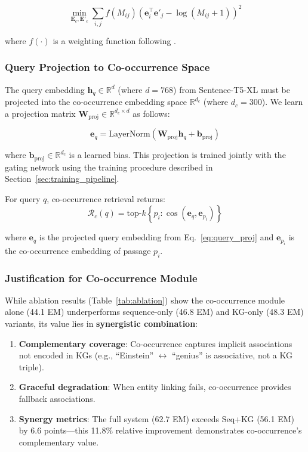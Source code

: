 \documentclass[10pt,twocolumn]{article}
\begin{document}
\begin{equation}
\min_{\mathbf{E}_c, \mathbf{E}'_c} \sum_{i,j} f(M_{ij}) \left( \mathbf{e}_i^\top \mathbf{e}'_j - \log(M_{ij} + 1) \right)^2
\end{equation}

where $f(\cdot)$ is a weighting function following \cite{pennington2014glove}.

\subsubsection{Query Projection to Co-occurrence Space}
\label{sec:query_projection}

The query embedding $\mathbf{h}_q \in \mathbb{R}^{d}$ (where $d=768$) from Sentence-T5-XL must be projected into the co-occurrence embedding space $\mathbb{R}^{d_c}$ (where $d_c=300$). We learn a projection matrix $\mathbf{W}_{\text{proj}} \in \mathbb{R}^{d_c \times d}$ as follows:

\begin{equation}
\mathbf{e}_q = \text{LayerNorm}(\mathbf{W}_{\text{proj}} \mathbf{h}_q + \mathbf{b}_{\text{proj}})
\label{eq:query_proj}
\end{equation}

where $\mathbf{b}_{\text{proj}} \in \mathbb{R}^{d_c}$ is a learned bias. This projection is trained jointly with the gating network using the training procedure described in Section~\ref{sec:training_pipeline}.

For query $q$, co-occurrence retrieval returns:
\begin{equation}
\mathcal{R}_c(q) = \text{top-}k \left\{ p_i : \cos(\mathbf{e}_q, \mathbf{e}_{p_i}) \right\}
\end{equation}

where $\mathbf{e}_q$ is the projected query embedding from Eq.~\ref{eq:query_proj} and $\mathbf{e}_{p_i}$ is the co-occurrence embedding of passage $p_i$.


\subsubsection{Justification for Co-occurrence Module}
\label{sec:cooc_justification}

While ablation results (Table~\ref{tab:ablation}) show the co-occurrence module alone (44.1 EM) underperforms sequence-only (46.8 EM) and KG-only (48.3 EM) variants, its value lies in \textbf{synergistic combination}:

\begin{enumerate}
    \item \textbf{Complementary coverage}: Co-occurrence captures implicit associations not encoded in KGs (e.g., ``Einstein'' $\leftrightarrow$ ``genius'' is associative, not a KG triple).
    \item \textbf{Graceful degradation}: When entity linking fails, co-occurrence provides fallback associations.
    \item \textbf{Synergy metrics}: The full system (62.7 EM) exceeds Seq+KG (56.1 EM) by 6.6 points---this 11.8\% relative improvement demonstrates co-occurrence's complementary value.
\end{enumerate}
\end{document}
